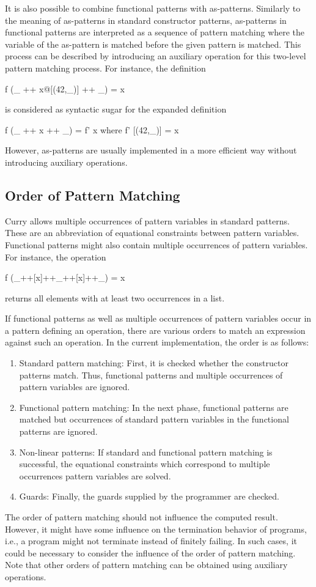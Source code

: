 %
It is also possible to combine functional patterns with
as-patterns.
Similarly to the meaning of as-patterns
in standard constructor patterns,
as-patterns in functional patterns are interpreted
as a sequence of pattern matching where the variable of the as-pattern
is matched before the given pattern is matched.
This process can be described by introducing an auxiliary operation
for this two-level pattern matching process.
For instance, the definition
\begin{curry}
f (_ ++ x@[(42,_)] ++ _) = x
\end{curry}
is considered as syntactic sugar for the expanded definition
\begin{curry}
f (_ ++ x ++ _) = f' x
 where
  f' [(42,_)] = x
\end{curry}
However, as-patterns are usually implemented
in a more efficient way without introducing auxiliary operations.

\subsection{Order of Pattern Matching}

Curry allows multiple occurrences of pattern variables
in standard patterns. These are an abbreviation of equational constraints
between pattern variables.
Functional patterns might also contain multiple occurrences of
pattern variables.
For instance, the operation
\begin{curry}
f (_++[x]++_++[x]++_) = x
\end{curry}
returns all elements with at least two occurrences in a list.

If functional patterns as well as multiple occurrences of
pattern variables occur in a pattern defining an operation,
there are various orders to match an expression against such
an operation. In the current implementation, the order
is as follows:
\begin{enumerate}
\item Standard pattern matching: First, it is checked whether
the constructor patterns match. Thus, functional patterns
and multiple occurrences of pattern variables are ignored.
\item Functional pattern matching: In the next phase,
functional patterns are matched but occurrences of standard
pattern variables in the functional patterns are ignored.
\item Non-linear patterns: If standard and functional pattern matching
is successful, the equational constraints which correspond
to multiple occurrences pattern variables are solved.
\item Guards: Finally, the guards supplied by the programmer
are checked.
\end{enumerate}
The order of pattern matching should not influence the computed
result. However, it might have some influence on the termination
behavior of programs, i.e., a program might not terminate
instead of finitely failing.
In such cases, it could be necessary to consider the influence
of the order of pattern matching. Note that other orders of pattern matching
can be obtained using auxiliary operations.


